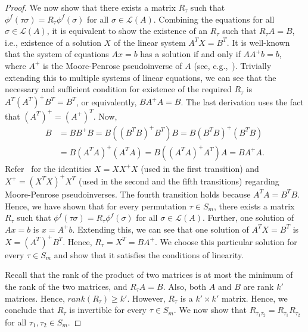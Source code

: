 \documentclass[prodmode,acmec]{ec-acmsmall}
\newcommand{\calL}{{\mathcal{L}}}
\newcommand{\rank}{{\calL(A)}}
\begin{document}
\begin{proof}
We now show that there exists a matrix $R_{\tau}$ such that $\phi^f(\tau \sigma) = R_{\tau} \phi^f(\sigma)$ for all $\sigma \in \rank$. Combining the equations for all $\sigma \in \rank$, it is equivalent to show the existence of an $R_{\tau}$ such that $R_{\tau} A = B$, i.e., existence of a solution $X$ of the linear system $A^T X = B^T$. It is well-known that the system of equations $Ax=b$ has a solution if and only if $AA^{+}b = b$, where $A^{+}$ is the Moore-Penrose pseudoinverse of $A$ (see, e.g.,~\cite{BH12}). Trivially extending this to multiple systems of linear equations, we can see that the necessary and sufficient condition for existence of the required $R_{\tau}$ is $A^T (A^T)^{+} B^T = B^T$, or equivalently, $B A^{+} A = B$. The last derivation uses the fact that $(A^T)^{+} = (A^{+})^T$. Now, 
\begin{align*}
B &= B B^{+} B = B \left( (B^T B)^{+} B^T \right) B = B (B^T B)^{+} \left( B^T B \right) \\
&= B (A^T A)^{+} \left( A^T A \right) = B \left( (A^T A)^{+} A^T \right) A = B A^{+} A.
\end{align*}
Refer~\cite{BH12} for the identities $X = X X^{+} X$ (used in the first transition) and $X^{+} = (X^T X)^{+} X^T$ (used in the second and the fifth transitions) regarding Moore-Penrose pseudoinverses. The fourth transition holds because $A^T A = B^T B$. Hence, we have shown that for every permutation $\tau \in S_m$, there exists a matrix $R_{\tau}$ such that $\phi^f(\tau \sigma) = R_{\tau} \phi^f(\sigma)$ for all $\sigma \in \rank$. Further, one solution of $Ax=b$ is $x = A^{+}b$. Extending this, we can see that one solution of $A^T X = B^T$ is $X = (A^T)^{+} B^T$. Hence, $R_{\tau} = X^T = BA^{+}$. We choose this particular solution for every $\tau \in S_m$ and show that it satisfies the conditions of linearity. 

Recall that the rank of the product of two matrices is at most the minimum of the rank of the two matrices, and $R_{\tau} A = B$. Also, both $A$ and $B$ are rank $k'$ matrices. Hence, $rank(R_{\tau}) \ge k'$. However, $R_{\tau}$ is a $k' \times k'$ matrix. Hence, we conclude that $R_{\tau}$ is invertible for every $\tau \in S_m$. We now show that $R_{\tau_1 \tau_2} = R_{\tau_1} R_{\tau_2}$ for all $\tau_1,\tau_2 \in S_m$. 


\end{proof}
\end{document}

